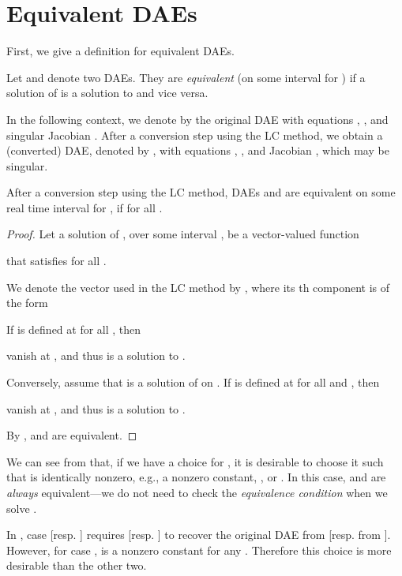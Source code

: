 \section{Equivalent DAEs}\label{sc:equivalent}
First, we give a definition for equivalent DAEs.
\begin{definition}\label{df:equivalent}
Let  and  denote two DAEs. They are {\em equivalent} (on some interval for )
if a solution of  is a solution to 
and vice versa.
\end{definition}

In the following context, we denote by  the original DAE with equations , , and singular Jacobian . After a conversion step using the LC method, we obtain a (converted) DAE, denoted by , with equations , , and Jacobian , which may be singular.

\begin{theorem}\label{th:equivLC}
After a conversion step using the LC method, DAEs  and  are equivalent on some real time interval  for , if  for all .
\end{theorem}

\begin{proof}
Let a solution of , over some interval , be a vector-valued function 

that satisfies  for all .

We denote the vector used in the LC method by , where its th component is of the form


If  is defined at  for all , then

 vanish at , and thus   is a solution to .

Conversely, assume that  is a solution of  on . If  is defined at  for all  and
, then 

vanish at , and thus  is a solution to .

By ,  and  are equivalent.
\end{proof}

\begin{remark}\label{rm:goodchoiceLC}
We can see from  that, if we have a choice for , it is desirable to choose it such that  is identically nonzero, e.g., a nonzero constant,  , or . In this case,  and  are {\em always} equivalent---we do not need to check the {\em equivalence condition}  when we solve .
\end{remark}

\begin{example}
In , case  [resp. ]  requires  [resp. ] to recover the original DAE  from  [resp. from ].  However, for case ,   is a nonzero constant for any . Therefore this choice is more desirable than the other two.
\end{example}



